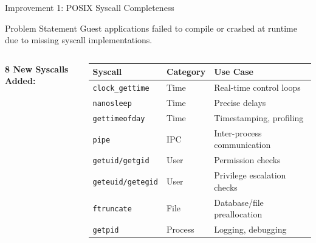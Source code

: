 \documentclass[aspectratio=169, 10pt]{beamer}
\begin{document}
\begin{frame}{Improvement 1: POSIX Syscall Completeness}
    \begin{block}{Problem Statement}
        Guest applications failed to compile or crashed at runtime due to missing syscall implementations.
    \end{block}

    \vspace{0.2cm}
    \begin{columns}[T]
        \textbf{8 New Syscalls Added:}
        \vspace{0.1cm}
        \begin{table}
            \tiny
            \begin{tabular}{@{}lll@{}}
                \toprule
                \textbf{Syscall} & \textbf{Category} & \textbf{Use Case} \\
                \midrule
                \texttt{clock\_gettime} & Time & Real-time control loops \\
                \texttt{nanosleep} & Time & Precise delays \\
                \texttt{gettimeofday} & Time & Timestamping, profiling \\
                \texttt{pipe} & IPC & Inter-process communication \\
                \texttt{getuid/getgid} & User & Permission checks \\
                \texttt{geteuid/getegid} & User & Privilege escalation checks \\
                \texttt{ftruncate} & File & Database/file preallocation \\
                \texttt{getpid} & Process & Logging, debugging \\
                \bottomrule
            \end{tabular}
        \end{table}


\end{columns}
\end{frame}
\end{document}
